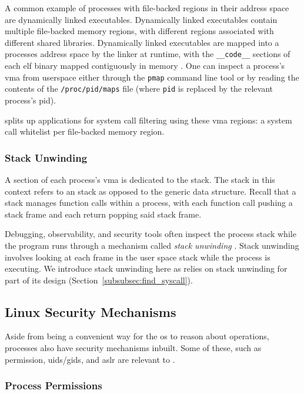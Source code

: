 A common example of processes with file-backed regions in their address space
are dynamically linked executables. Dynamically linked executables contain
multiple file-backed memory regions, with different regions associated
with different shared libraries. Dynamically linked executables are mapped
into a processes address space by the linker at runtime, with the
\texttt{\_\_code\_\_} sections of each \ac{elf} binary mapped contiguously 
in memory \cite{DYNAMIC_LINKERS_OS}. One can inspect a process's \ac{vma} from
userspace either through the \texttt{pmap} command line tool or by reading
the contents of the \texttt{/proc/pid/maps} file (where \texttt{pid} is
replaced by the relevant process's \ac{pid}). 

\af splits up applications for system call filtering using these \ac{vma} regions: a system call
whitelist per file-backed memory region.

\subsubsection{Stack Unwinding}

A section of each process's \ac{vma} is dedicated to the stack. The stack in
this context refers to an  stack as opposed to the generic data
structure. Recall that a stack manages function calls within a
process, with each function call pushing a stack frame and each return popping
said stack frame.
 
Debugging, observability, and security tools often inspect the process stack
while the program runs through a mechanism called \textit{stack
unwinding} \cite{gregg2014linux, kilroy2022linker}. Stack unwinding involves looking at 
each frame in the user space stack while the process is executing. We
introduce stack unwinding here as \af relies on stack unwinding for part of
its design (Section~\ref{subsubsec:find_syscall}).

\subsection{Linux Security Mechanisms}

Aside from being a convenient way for the \ac{os} to reason about
operations, processes also have security mechanisms inbuilt. Some of these, such as
permission, \acp{uid}/\acp{gid}, and \ac{aslr} are relevant to \af.

\subsubsection{Process Permissions}


